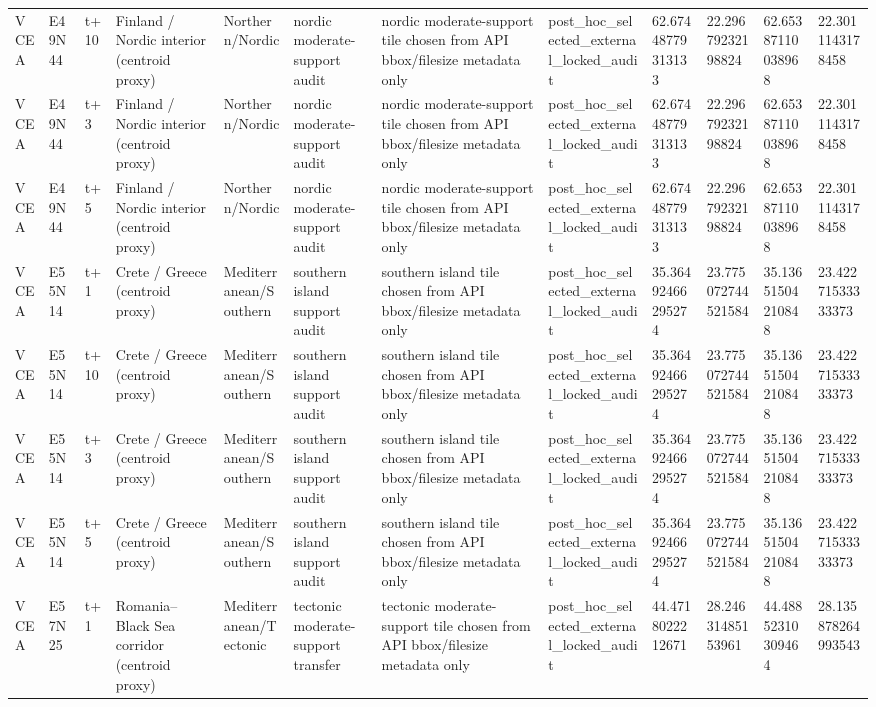 \begin{landscape}
\begin{longtable}{llllllllllll}
VCEA & E49N44 & t+10 & Finland / Nordic interior (centroid proxy) & Northern/Nordic & nordic moderate-support audit & nordic moderate-support tile chosen from API bbox/filesize metadata only & post\_hoc\_selected\_external\_locked\_audit & 62.67448779313133 & 22.29679232198824 & 62.65387110038968 & 22.3011143178458 \\
VCEA & E49N44 & t+3 & Finland / Nordic interior (centroid proxy) & Northern/Nordic & nordic moderate-support audit & nordic moderate-support tile chosen from API bbox/filesize metadata only & post\_hoc\_selected\_external\_locked\_audit & 62.67448779313133 & 22.29679232198824 & 62.65387110038968 & 22.3011143178458 \\
VCEA & E49N44 & t+5 & Finland / Nordic interior (centroid proxy) & Northern/Nordic & nordic moderate-support audit & nordic moderate-support tile chosen from API bbox/filesize metadata only & post\_hoc\_selected\_external\_locked\_audit & 62.67448779313133 & 22.29679232198824 & 62.65387110038968 & 22.3011143178458 \\
VCEA & E55N14 & t+1 & Crete / Greece (centroid proxy) & Mediterranean/Southern & southern island support audit & southern island tile chosen from API bbox/filesize metadata only & post\_hoc\_selected\_external\_locked\_audit & 35.36492466295274 & 23.775072744521584 & 35.13651504210848 & 23.42271533333373 \\
VCEA & E55N14 & t+10 & Crete / Greece (centroid proxy) & Mediterranean/Southern & southern island support audit & southern island tile chosen from API bbox/filesize metadata only & post\_hoc\_selected\_external\_locked\_audit & 35.36492466295274 & 23.775072744521584 & 35.13651504210848 & 23.42271533333373 \\
VCEA & E55N14 & t+3 & Crete / Greece (centroid proxy) & Mediterranean/Southern & southern island support audit & southern island tile chosen from API bbox/filesize metadata only & post\_hoc\_selected\_external\_locked\_audit & 35.36492466295274 & 23.775072744521584 & 35.13651504210848 & 23.42271533333373 \\
VCEA & E55N14 & t+5 & Crete / Greece (centroid proxy) & Mediterranean/Southern & southern island support audit & southern island tile chosen from API bbox/filesize metadata only & post\_hoc\_selected\_external\_locked\_audit & 35.36492466295274 & 23.775072744521584 & 35.13651504210848 & 23.42271533333373 \\
VCEA & E57N25 & t+1 & Romania–Black Sea corridor (centroid proxy) & Mediterranean/Tectonic & tectonic moderate-support transfer & tectonic moderate-support tile chosen from API bbox/filesize metadata only & post\_hoc\_selected\_external\_locked\_audit & 44.4718022212671 & 28.24631485153961 & 44.48852310309464 & 28.135878264993543 \\

\end{longtable}
\end{landscape}
